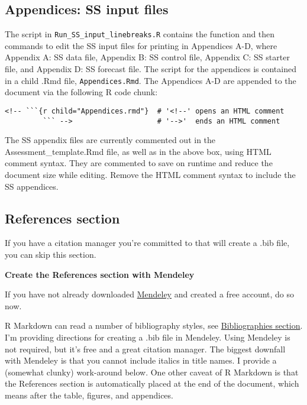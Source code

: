 \documentclass[12pt,]{article}
\begin{document}
\subsection{Appendices: SS input files}\label{appendices-ss-input-files}

The script in \texttt{Run\_SS\_input\_linebreaks.R} contains the
function and then commands to edit the SS input files for printing in
Appendices A-D, where Appendix A: SS data file, Appendix B: SS control
file, Appendix C: SS starter file, and Appendix D: SS forecast file. The
script for the appendices is contained in a child .Rmd file,
\texttt{Appendices.Rmd}. The Appendices A-D are appended to the document
via the following R code chunk:

\begin{Verbatim}[frame=single]
<!-- ```{r child="Appendices.rmd"}  # '<!--' opens an HTML comment
         ``` -->                    # '-->'  ends an HTML comment
\end{Verbatim}

The SS appendix files are currently commented out in the
Assessment\_template.Rmd file, as well as in the above box, using HTML
comment syntax. They are commented to save on runtime and reduce the
document size while editing. Remove the HTML comment syntax to include
the SS appendices.

\subsection{References section}\label{references-section}

If you have a citation manager you're committed to that will create a
.bib file, you can skip this section.

\textbf{Create the References section with Mendeley}

If you have not already downloaded
\href{https://www.mendeley.com/}{Mendeley} and created a free account,
do so now.

R Markdown can read a number of bibliography styles, see
\href{http://rmarkdown.rstudio.com/authoring_bibliographies_and_citations.html}{Bibliographies
section}. I'm providing directions for creating a .bib file in Mendeley.
Using Mendeley is not required, but it's free and a great citation
manager. The biggest downfall with Mendeley is that you cannot include
italics in title names. I provide a (somewhat clunky) work-around below.
One other caveat of R Markdown is that the References section is
automatically placed at the end of the document, which means after the
table, figures, and appendices.
\end{document}
